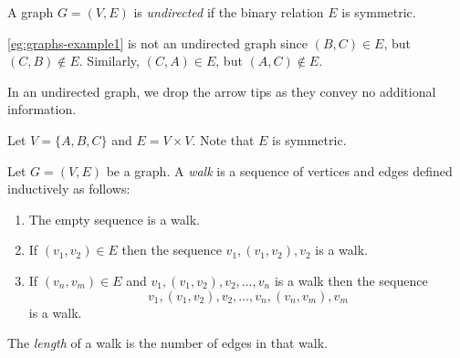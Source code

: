 \documentclass{amsart}
\begin{document}
\begin{defn}
  \label{defn:graphs-undirected}
  A graph $G = (V,E)$ is \emph{undirected} if the binary relation $E$ is symmetric.
\end{defn}

\para
\cref{eg:graphs-example1} is not an undirected graph since $(B,C) \in E$, but $(C,B) \notin E$.
Similarly, $(C,A) \in E$, but $(A,C) \notin E$.

\para
In an undirected graph, we drop the arrow tips as they convey no additional information.

\begin{eg}
  \label{eg:graphs-example2}
  Let $V = \{A, B, C\}$ and $E = V \times V$.
  Note that $E$ is symmetric.
  \begin{center}
  \end{center}
\end{eg}

\begin{defn}
  \label{defn:walks}
  Let $G = (V,E)$ be a graph.
  A \emph{walk} is a sequence of vertices and edges defined inductively as follows:
  \begin{enumerate}
  \item The empty sequence is a walk.
  \item If $(v_{1},v_{2}) \in E$ then the sequence $v_{1},(v_{1},v_{2}),v_{2}$ is a walk.
  \item If $(v_{n}, v_{m}) \in E$ and $v_{1},(v_{1},v_{2}),v_{2},\ldots,v_{n}$ is a walk then the sequence
    \[
      v_{1},(v_{1},v_{2}),v_{2},\ldots,v_{n},(v_{n},v_{m}),v_{m}
    \]
    is a walk.
  \end{enumerate}
\end{defn}

\begin{defn}
  \label{defn:walks-length}
  The \emph{length} of a walk is the number of edges in that walk.
\end{defn}
\end{document}
